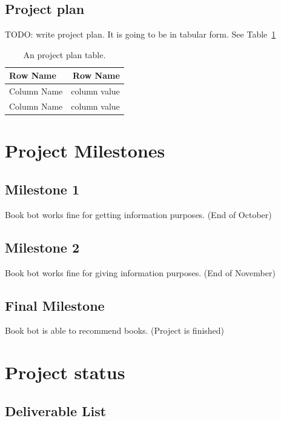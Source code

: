 \documentclass[a4paper]{article}
\begin{document}
\newpage

\subsection{Project plan}

TODO: write project plan. It is going to be in tabular form. See Table~\ref{tab:projectplan}

\begin{table}
\centering
\begin{tabular}{l|r}
Row Name & Row Name \\\hline
Column Name & column value \\
Column Name & column value
\end{tabular}
\caption{\label{tab:projectplan}An project plan table.}
\end{table}

\section{Project Milestones}
\subsection{Milestone 1}
Book bot works fine for getting information purposes. (End of October)
\subsection{Milestone 2}
Book bot works fine for giving information purposes. (End of November)
\subsection{Final Milestone}
Book bot is able to recommend books. (Project is finished)

\section{Project status}
\subsection{Deliverable List}
\end{document}
